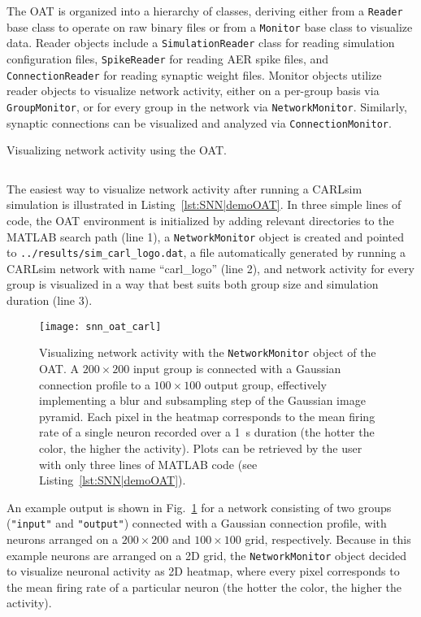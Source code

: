 The \ac{OAT} is organized into a hierarchy of classes,
deriving either from a \texttt{Reader} base class to operate
on raw binary files or from a \texttt{Monitor} base class
to visualize data.
Reader objects include a \texttt{SimulationReader} class
for reading simulation configuration files,
\texttt{SpikeReader} for reading \ac{AER} spike files,
and \texttt{ConnectionReader} for reading synaptic weight files.
Monitor objects utilize reader objects to visualize network
activity, either on a per-group basis via \texttt{GroupMonitor},
or for every group in the network via \texttt{NetworkMonitor}.
Similarly, synaptic connections can be visualized and analyzed
via \texttt{ConnectionMonitor}.

\begin{listing}[h]
\caption{Visualizing network activity using the \ac{OAT}.}
\vspace{-0.7cm}
\inputminted{matlab}{listings/snn_oat.m}
\label{lst:SNN|demoOAT}
\end{listing}

The easiest way to visualize network activity after running
a CARLsim simulation is illustrated in
Listing~\ref{lst:SNN|demoOAT}.
In three simple lines of code, the \ac{OAT} environment is
initialized by adding relevant directories to the MATLAB
search path (line 1),
a \texttt{NetworkMonitor} object is created and pointed to
\texttt{../results/sim\_carl\_logo.dat}, a file automatically
generated by running a CARLsim network with name ``carl\_logo'' (line 2),
and network activity for every group is visualized in a 
way that best suits both group size and simulation duration (line 3).

\begin{figure}[t]
  \centering
  \texttt{[image: snn\_oat\_carl]}
  \caption{
  Visualizing network activity with the \texttt{NetworkMonitor} object
  of the \ac{OAT}.
  A $200\times200$ input group is connected with a Gaussian
  connection profile to a $100\times100$ output group,
  effectively implementing a 
  blur and subsampling step of the Gaussian image pyramid.
  Each pixel in the heatmap corresponds to the mean firing rate of a
  single neuron recorded over a \SI{1}{\second} duration
  (the hotter the color, the higher the activity).
  Plots can be retrieved by the user with only three lines of
  MATLAB code (see Listing~\ref{lst:SNN|demoOAT}).}
  \label{fig:SNN|OAT|carl}
\end{figure}

An example output is shown in Fig.~\ref{fig:SNN|OAT|carl}
for a network consisting of two groups (\texttt{"input"}
and \texttt{"output"})
connected with a Gaussian connection profile,
with neurons arranged on a $200\times200$ and $100\times100$
grid, respectively.
Because in this example neurons are arranged on a 2D grid, the
\texttt{NetworkMonitor} object decided to visualize neuronal activity
as 2D heatmap, where every pixel corresponds to the mean firing rate
of a particular neuron
(the hotter the color, the higher the activity).

